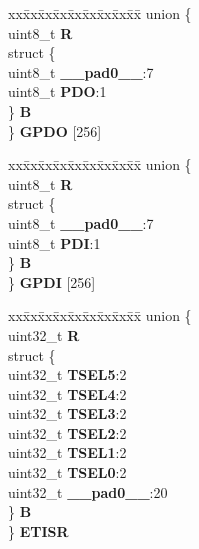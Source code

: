 \begin{DoxyCompactItemize}
\begin{tabbing}
\end{tabbing}\item 
\mbox{\label{structSIU__tag_a1b34642587b2f7d03effc221b5295997}} 
\begin{tabbing}
xx\=xx\=xx\=xx\=xx\=xx\=xx\=xx\=xx\=\kill
union \{\\
\>uint8\_t {\bfseries R}\\
\>struct \{\\
\>\>uint8\_t {\bfseries \_\_pad0\_\_}:7\\
\>\>uint8\_t {\bfseries PDO}:1\\
\>\} {\bfseries B}\\
\} {\bfseries GPDO} \mbox{[}256\mbox{]}\\

\end{tabbing}\item 
\mbox{\label{structSIU__tag_aeb431847a717ce12ed02dd8705cd6d02}} 
\begin{tabbing}
xx\=xx\=xx\=xx\=xx\=xx\=xx\=xx\=xx\=\kill
union \{\\
\>uint8\_t {\bfseries R}\\
\>struct \{\\
\>\>uint8\_t {\bfseries \_\_pad0\_\_}:7\\
\>\>uint8\_t {\bfseries PDI}:1\\
\>\} {\bfseries B}\\
\} {\bfseries GPDI} \mbox{[}256\mbox{]}\\

\end{tabbing}\item 
\mbox{\label{structSIU__tag_a29159316b2797c58cf416fa31b746b14}} 
\begin{tabbing}
xx\=xx\=xx\=xx\=xx\=xx\=xx\=xx\=xx\=\kill
union \{\\
\>uint32\_t {\bfseries R}\\
\>struct \{\\
\>\>uint32\_t {\bfseries TSEL5}:2\\
\>\>uint32\_t {\bfseries TSEL4}:2\\
\>\>uint32\_t {\bfseries TSEL3}:2\\
\>\>uint32\_t {\bfseries TSEL2}:2\\
\>\>uint32\_t {\bfseries TSEL1}:2\\
\>\>uint32\_t {\bfseries TSEL0}:2\\
\>\>uint32\_t {\bfseries \_\_pad0\_\_}:20\\
\>\} {\bfseries B}\\
\} {\bfseries ETISR}\\


\end{tabbing}
\end{DoxyCompactItemize}
